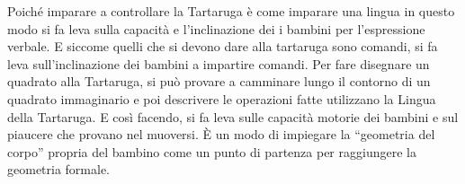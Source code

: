 Poiché imparare a controllare la Tartaruga è come imparare una lingua in questo modo si fa leva sulla capacità e l'inclinazione dei i bambini per l'espressione verbale. E siccome quelli che si devono dare alla tartaruga sono comandi, si fa leva sull'inclinazione dei bambini a impartire comandi. Per fare disegnare un quadrato alla Tartaruga, si può provare a camminare lungo il contorno di un quadrato immaginario e poi descrivere le operazioni fatte utilizzano la Lingua della Tartaruga. E così facendo, si fa leva sulle capacità motorie dei bambini e sul piaucere che provano nel muoversi. È un modo di impiegare la “geometria del corpo” propria del bambino come un punto di partenza per raggiungere la geometria formale. 


